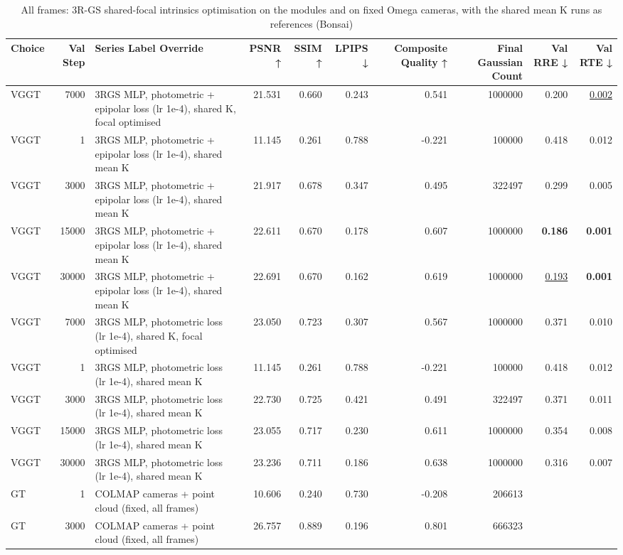 \begin{table}[H]
\caption{\ifdefined\customcaption \customcaption \else All frames: 3R-GS shared-focal intrinsics optimisation on the modules and on fixed Omega cameras, with the shared mean K runs as references (Bonsai) \fi}
\label{tab:121_omega_epi_intropt_bonsai}
\centering
\tiny
\begin{tabular}{lrlrrrrrrr}
\toprule
Choice & Val Step & Series Label Override & PSNR ↑ & SSIM ↑ & LPIPS ↓ & Composite Quality ↑ & Final Gaussian Count & Val RRE ↓ & Val RTE ↓ \\
\midrule
VGGT & 7000 & 3RGS MLP, photometric + epipolar loss (lr 1e-4), shared K, focal optimised & 21.531 & 0.660 & 0.243 & 0.541 & 1000000 & 0.200 & \underline{0.002} \\
VGGT & 1 & 3RGS MLP, photometric + epipolar loss (lr 1e-4), shared mean K & 11.145 & 0.261 & 0.788 & -0.221 & 100000 & 0.418 & 0.012 \\
VGGT & 3000 & 3RGS MLP, photometric + epipolar loss (lr 1e-4), shared mean K & 21.917 & 0.678 & 0.347 & 0.495 & 322497 & 0.299 & 0.005 \\
VGGT & 15000 & 3RGS MLP, photometric + epipolar loss (lr 1e-4), shared mean K & 22.611 & 0.670 & 0.178 & 0.607 & 1000000 & \textbf{0.186} & \textbf{0.001} \\
VGGT & 30000 & 3RGS MLP, photometric + epipolar loss (lr 1e-4), shared mean K & 22.691 & 0.670 & 0.162 & 0.619 & 1000000 & \underline{0.193} & \textbf{0.001} \\
VGGT & 7000 & 3RGS MLP, photometric loss (lr 1e-4), shared K, focal optimised & 23.050 & 0.723 & 0.307 & 0.567 & 1000000 & 0.371 & 0.010 \\
VGGT & 1 & 3RGS MLP, photometric loss (lr 1e-4), shared mean K & 11.145 & 0.261 & 0.788 & -0.221 & 100000 & 0.418 & 0.012 \\
VGGT & 3000 & 3RGS MLP, photometric loss (lr 1e-4), shared mean K & 22.730 & 0.725 & 0.421 & 0.491 & 322497 & 0.371 & 0.011 \\
VGGT & 15000 & 3RGS MLP, photometric loss (lr 1e-4), shared mean K & 23.055 & 0.717 & 0.230 & 0.611 & 1000000 & 0.354 & 0.008 \\
VGGT & 30000 & 3RGS MLP, photometric loss (lr 1e-4), shared mean K & 23.236 & 0.711 & 0.186 & 0.638 & 1000000 & 0.316 & 0.007 \\
GT & 1 & COLMAP cameras + point cloud (fixed, all frames) & 10.606 & 0.240 & 0.730 & -0.208 & 206613 &  &  \\
GT & 3000 & COLMAP cameras + point cloud (fixed, all frames) & 26.757 & 0.889 & 0.196 & 0.801 & 666323 &  &  \\

\end{tabular}
\end{table}
